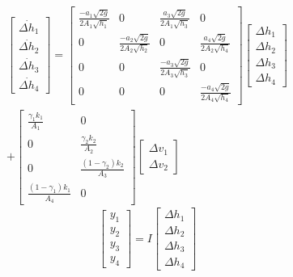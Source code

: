 \begin{multline}
	\begin{bmatrix}
		\dot{\Delta h_{1}} \\
		\dot{\Delta h_{2}} \\
		\dot{\Delta h_{3}} \\
		\dot{\Delta h_{4}} 
	\end{bmatrix}
	= 
	\begin{bmatrix}
		\frac{-a_{1}\sqrt{2g}}{2A_{1}\sqrt{h_{1}}} & 0 & \frac{a_{3}\sqrt{2g}}{2A_{1}\sqrt{h_{3}}} & 0 \\
		0 & \frac{-a_{2}\sqrt{2g}}{2A_{2}\sqrt{h_{2}}} & 0 & \frac{a_{4}\sqrt{2g}}{2A_{2}\sqrt{h_{4}}} \\
		0 & 0 & \frac{-a_{3}\sqrt{2g}}{2A_{3}\sqrt{h_{3}}} & 0 \\
		0 & 0 & 0 & \frac{-a_{4}\sqrt{2g}}{2A_{4}\sqrt{h_{4}}}
	\end{bmatrix}
	\begin{bmatrix}
		\Delta h_{1} \\
		\Delta h_{2} \\
		\Delta h_{3} \\
		\Delta h_{4} 
	\end{bmatrix}
	\\+
	\begin{bmatrix}
		\frac{\gamma_{1}k_{1}}{A_{1}} & 0 \\
		0 & \frac{\gamma_{2}k_{2}}{A_{2}} \\
		0 & \frac{(1-\gamma_{2}) k_{2}}{A_{3}} \\
		\frac{(1-\gamma_{1})k_{1}}{A_{4}} & 0
	\end{bmatrix}
	\begin{bmatrix}
		\Delta v_{1} \\
		\Delta v_{2}
	\end{bmatrix}
	\label{eq2}
\end{multline}
\begin{equation}
	\begin{bmatrix}
		y_{1} \\
		y_{2} \\
		y_{3} \\
		y_{4} 
	\end{bmatrix}
	= 
	I
	\begin{bmatrix}
		\Delta h_{1} \\
		\Delta h_{2} \\
		\Delta h_{3} \\
		\Delta h_{4} 
	\end{bmatrix}
	\label{eq3}
\end{equation}

